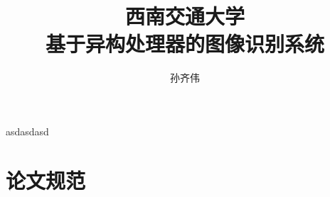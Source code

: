 \documentclass[bachelor]{swjtuthesis}
\title{西南交通大学\\基于异构处理器的图像识别系统}
\author{孙齐伟}
\begin{document}
\maketitle

%

\frontmatter

\tableofcontents
\listoffigures
\listoftables
% 


\mainmatter








% 
% 
% 
asdasdasd\cite{jxz}


\appendix
\chapter{论文规范}


\backmatter


\end{document}
